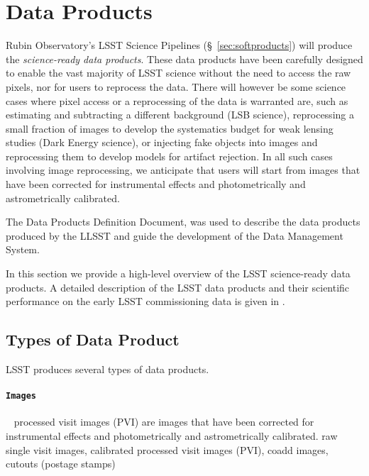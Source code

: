 \section{Data Products} \label{sec:dataproducts}

 Rubin Observatory’s LSST Science Pipelines (\S~\ref{sec:softproducts}) will produce the \emph{science-ready data products}.
 These data products have been carefully designed to enable the vast majority of LSST science without the need to access the raw pixels, nor for users to reprocess the data. 
There will however be some science cases where pixel access or a reprocessing of the data is warranted are, such as estimating and subtracting a different background (LSB science), reprocessing a small fraction of images to develop the systematics budget for weak lensing studies (Dark Energy science), or injecting fake objects into images and reprocessing them to develop models for artifact rejection.  
In all such cases involving image reprocessing, we anticipate that users will start from images that have been corrected for instrumental effects and photometrically and astrometrically calibrated. 

The Data Products Definition Document, \citep{LSE-163} was used to  describe the data products produced by the LLSST  and guide the development of the Data Management System.

In this section we provide a high-level overview of the LSST science-ready data products. 
A detailed description of the LSST data products and their scientific performance on the early LSST commissioning data is given in \citep{PSTN-024}.




\subsection{Types of Data Product} \label{sec:dp-types}
LSST produces several types of data products. 

\paragraph {\tt Images}~
processed visit images (PVI) are images that have been corrected for instrumental effects and photometrically and astrometrically  calibrated.
raw single visit images, calibrated processed visit images (PVI), coadd images, cutouts (postage stamps)


